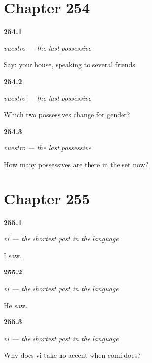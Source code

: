 \section*{Chapter 254}

\noindent\begin{minipage}[t]{\linewidth}
\raggedright
\hypertarget{review-ES-C65-vuestro-say}{\textbf{254.1}} \emph{vuestro — the last possessive}\par
\small Say: your house, speaking to several friends.
\end{minipage}\par\medskip

\noindent\begin{minipage}[t]{\linewidth}
\raggedright
\hypertarget{review-ES-C65-vuestro-which}{\textbf{254.2}} \emph{vuestro — the last possessive}\par
\small Which two possessives change for gender?
\end{minipage}\par\medskip

\noindent\begin{minipage}[t]{\linewidth}
\raggedright
\hypertarget{review-ES-C65-vuestro-count}{\textbf{254.3}} \emph{vuestro — the last possessive}\par
\small How many possessives are there in the set now?
\end{minipage}\par\medskip

\section*{Chapter 255}

\noindent\begin{minipage}[t]{\linewidth}
\raggedright
\hypertarget{review-ES-C65-vi-di-saw}{\textbf{255.1}} \emph{vi — the shortest past in the language}\par
\small I saw.
\end{minipage}\par\medskip

\noindent\begin{minipage}[t]{\linewidth}
\raggedright
\hypertarget{review-ES-C65-vi-di-third}{\textbf{255.2}} \emph{vi — the shortest past in the language}\par
\small He saw.
\end{minipage}\par\medskip

\noindent\begin{minipage}[t]{\linewidth}
\raggedright
\hypertarget{review-ES-C65-vi-di-accent}{\textbf{255.3}} \emph{vi — the shortest past in the language}\par
\small Why does vi take no accent when comi does?
\end{minipage}\par\medskip

